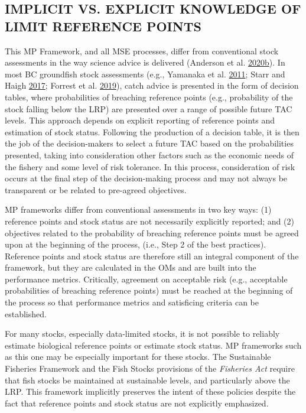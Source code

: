 \documentclass[11pt]{book}
\begin{document}
\hypertarget{sec:discussion-implicit}{%
\subsection{IMPLICIT VS. EXPLICIT KNOWLEDGE OF LIMIT REFERENCE POINTS}\label{sec:discussion-implicit}}

This MP Framework, and all MSE processes, differ from conventional stock assessments in the way science advice is delivered (Anderson et al. \protect\hyperlink{ref-anderson2020gfmp}{2020}\protect\hyperlink{ref-anderson2020gfmp}{b}). In most BC groundfish stock assessments (e.g., Yamanaka et al. \protect\hyperlink{ref-yamanaka2011}{2011}; Starr and Haigh \protect\hyperlink{ref-starr2017}{2017}; Forrest et al. \protect\hyperlink{ref-forrest2019}{2019}), catch advice is presented in the form of decision tables, where probabilities of breaching reference points (e.g., probability of the stock falling below the LRP) are presented over a range of possible future TAC levels. This approach depends on explicit reporting of reference points and estimation of stock status. Following the production of a decision table, it is then the job of the decision-makers to select a future TAC based on the probabilities presented, taking into consideration other factors such as the economic needs of the fishery and some level of risk tolerance. In this process, consideration of risk occurs at the final step of the decision-making process and may not always be transparent or be related to pre-agreed objectives.

MP frameworks differ from conventional assessments in two key ways: (1) reference points and stock status are not necessarily explicitly reported; and (2) objectives related to the probability of breaching reference points must be agreed upon at the beginning of the process, (i.e., Step 2 of the best practices). Reference points and stock status are therefore still an integral component of the framework, but they are calculated in the OMs and are built into the performance metrics. Critically, agreement on acceptable risk (e.g., acceptable probabilities of breaching reference points) must be reached at the beginning of the process so that performance metrics and satisficing criteria can be established.

For many stocks, especially data-limited stocks, it is not possible to reliably estimate biological reference points or estimate stock status. MP frameworks such as this one may be especially important for these stocks. The Sustainable Fisheries Framework and the Fish Stocks provisions of the \emph{Fisheries Act} require that fish stocks be maintained at sustainable levels, and particularly above the LRP. This framework implicitly preserves the intent of these policies despite the fact that reference points and stock status are not explicitly emphasized.
\end{document}
